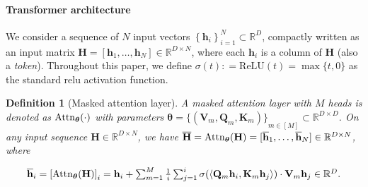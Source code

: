 \documentclass[10pt]{article}
\newtheorem{definition}[theorem]{Definition}
\renewcommand{\bar}{\overline}
\newcommand{\<}{\left\langle}
\renewcommand{\>}{\right\rangle}
\renewcommand{\bQ}{\mathbf{Q}}
\newcommand{\relu}{\mathrm{ReLU}}
\newcommand{\Attn}{{\rm Attn}}
\newcommand{\barsig}{\sigma}
\newcommand{\paren}[1]{{\left( #1 \right)}}
\newcommand{\brac}[1]{{\left[ #1 \right]}}
\newcommand{\set}[1]{{\left\{ #1 \right\}}}
\newcommand{\sets}[1]{{\{ #1 \}}}
\newcommand{\defeq}{\mathrel{\mathop:}=}
\newcommand{\R}{\mathbb{R}}
\def\bH{{\mathbf H}}
\def\bK{{\mathbf K}}
\def\bQ{{\mathbf Q}}
\def\bV{{\mathbf V}}
\def\btheta{{\boldsymbol \theta}}
\def\bh{{\mathbf h}}
\begin{document}
\paragraph{Transformer architecture} We consider a sequence of $N$ input vectors $\set{\bh_i}_{i=1}^N\subset \R^D$, compactly written as an input matrix $\bH=[\bh_1,\dots,\bh_N]\in \R^{D\times N}$, where each $\bh_i$ is a column of $\bH$ (also a \emph{token}). Throughout this paper, we define $\sigma(t)\defeq \relu(t)=\max\sets{t,0}$ as the standard relu activation function. 




\begin{definition}[Masked attention layer]
\label{def:masked-attention}
A masked attention layer with $M$ heads is denoted as $\Attn_{\btheta}(\cdot)$ with parameters $\btheta=\sets{ (\bV_m,\bQ_m,\bK_m)}_{m\in[M]}\subset \R^{D\times D}$. On any input sequence $\bH\in\R^{D\times N}$, we have $\bar{\bH} = \Attn_{\btheta}(\bH) = [\bar{\bh}_1, \ldots, \bar{\bh}_N] \in \R^{D \times N}$, where















\begin{align*}
\textstyle    \bar{\bh}_i = \brac{\Attn_{\btheta}(\bH)}_i = \bh_i + \sum_{m=1}^M \frac{1}{i}\sum_{j=1}^i \barsig\paren{ \<\bQ_m\bh_i, \bK_m\bh_j\> }\cdot \bV_m\bh_j \in \R^D.
\end{align*}
\end{definition}
\end{document}

